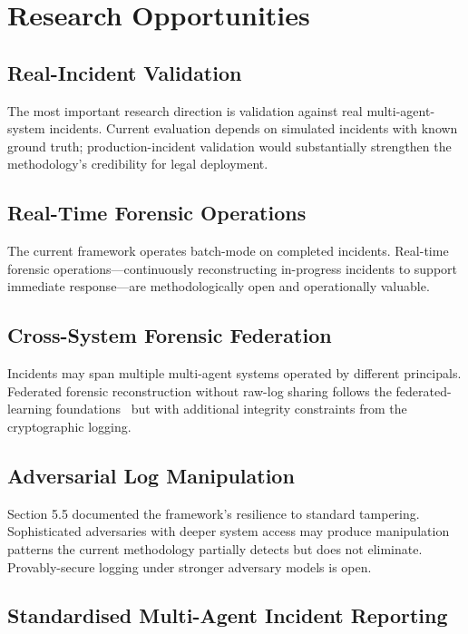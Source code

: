 \documentclass[sigconf,nonacm]{acmart}
\begin{document}
\section{Research Opportunities}

\subsection{Real-Incident Validation}

The most important research direction is validation against real
multi-agent-system incidents. Current evaluation depends on
simulated incidents with known ground truth; production-incident
validation would substantially strengthen the methodology's
credibility for legal deployment.

\subsection{Real-Time Forensic Operations}

The current framework operates batch-mode on completed incidents.
Real-time forensic operations---continuously reconstructing
in-progress incidents to support immediate response---are
methodologically open and operationally valuable.

\subsection{Cross-System Forensic Federation}

Incidents may span multiple multi-agent systems operated by
different principals. Federated forensic reconstruction without
raw-log sharing follows the federated-learning
foundations~\cite{kairouz2024fedml} but with additional integrity
constraints from the cryptographic logging.

\subsection{Adversarial Log Manipulation}

Section 5.5 documented the framework's resilience to standard
tampering. Sophisticated adversaries with deeper system access
may produce manipulation patterns the current methodology
partially detects but does not eliminate. Provably-secure logging
under stronger adversary models is open.

\subsection{Standardised Multi-Agent Incident Reporting}
\end{document}
